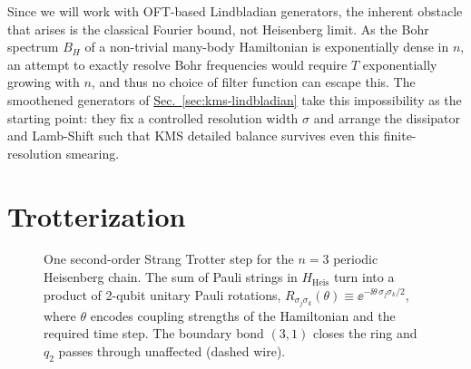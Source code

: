 Since we will work with OFT-based Lindbladian generators, the inherent obstacle that arises is the classical Fourier bound, not Heisenberg limit. As the Bohr spectrum $B_H$ of a non-trivial many-body Hamiltonian is exponentially dense in $n$, an attempt to exactly resolve Bohr frequencies would require $T$ exponentially growing with $n$, and thus no choice of filter function can escape this. The smoothened generators of \hyperref[sec:kms-lindbladian]{Sec.~\ref*{sec:kms-lindbladian}} take this impossibility as the starting point: they fix a controlled resolution width $\sigma$ and arrange the dissipator and Lamb-Shift such that KMS detailed balance survives even this finite-resolution smearing.

\smallskip
\label{sec:prelim-trotter}
\section{Trotterization}
\begin{figure}[ht]
  \centering
  \caption{One second-order Strang Trotter step for the $n{=}3$ periodic
  Heisenberg chain. The sum of Pauli strings in $H_\mathrm{Heis}$ turn into a product of 2-qubit unitary Pauli rotations,
  $R_{\sigma_j\sigma_k}(\theta) \equiv \ee^{-\ii\theta\,\sigma_j\sigma_k/2}$, where $\theta$ encodes coupling strengths of the Hamiltonian and the required time step.
  The boundary bond $(3,1)$ closes the ring and $q_2$ passes through unaffected
  (dashed wire).}
  \label{circ:trotter-strang}
\end{figure}
